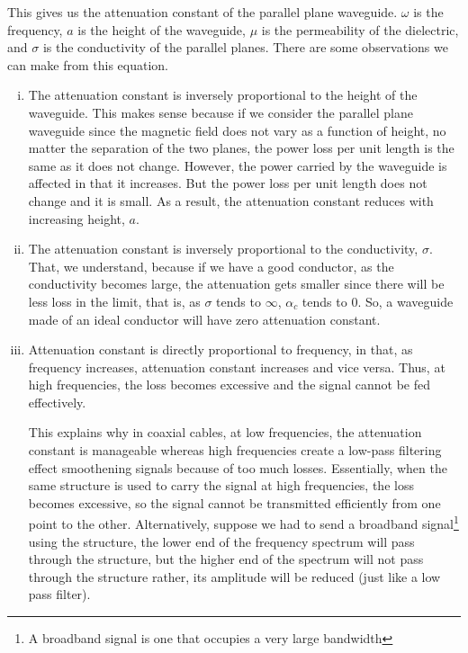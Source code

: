 This gives us the attenuation constant of the parallel plane waveguide. $\omega$ is the frequency, $a$ is the height of the waveguide, $\mu$ is the permeability of the dielectric, and $\sigma$ is the conductivity of the parallel planes. There are some observations we can make from this equation. 
\begin{enumerate}[(i)]
\item The attenuation constant is inversely proportional to the height of the waveguide. This makes sense because if we consider the parallel plane waveguide since the magnetic field does not vary as a function of height, no matter the separation of the two planes, the power loss per unit length is the same as it does not change. However, the power carried by the waveguide is affected in that it increases. But the power loss per unit length does not change and it is small. As a result, the attenuation constant reduces with increasing height, $a$.
\item The attenuation constant is inversely proportional to the conductivity, $\sigma$. That, we understand, because if we have a good conductor, as the conductivity becomes large, the attenuation gets smaller since there will be less loss in the limit, that is, as $\sigma$ tends to $\infty$, $\alpha_{c}$ tends to 0. So, a waveguide made of an ideal conductor will have zero attenuation constant.
\item Attenuation constant is directly proportional to frequency, in that, as frequency increases, attenuation constant increases and vice versa. Thus, at high frequencies, the loss becomes excessive and the signal cannot be fed effectively.

This explains why in coaxial cables, at low frequencies, the attenuation constant is manageable whereas high frequencies create a low-pass filtering effect smoothening signals because of too much losses. Essentially, when the same structure is used to carry the signal at high frequencies, the loss becomes excessive, so the signal cannot be transmitted efficiently from one point to the other. Alternatively, suppose we had to send a broadband signal\footnote{
A broadband signal is one that occupies a very large bandwidth
} using the structure, the lower end of the frequency spectrum will pass through the structure, but the higher end of the spectrum will not pass through the structure rather, its amplitude will be reduced (just like a low pass filter).
\end{enumerate}

